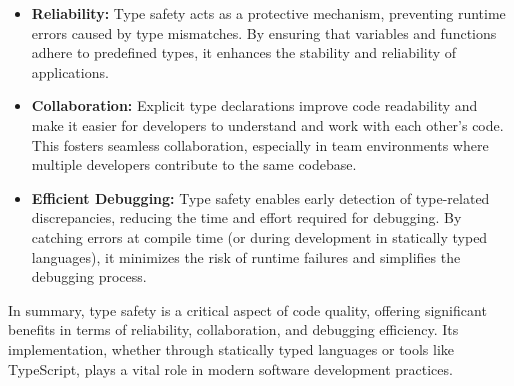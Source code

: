 \begin{itemize}
    \item \textbf{Reliability:} Type safety acts as a protective mechanism, preventing runtime errors caused by type mismatches. By ensuring that variables and functions adhere to predefined types, it enhances the stability and reliability of applications. \cite{dev:type-safety}

    \item \textbf{Collaboration:} Explicit type declarations improve code readability and make it easier for developers to understand and work with each other's code. This fosters seamless collaboration, especially in team environments where multiple developers contribute to the same codebase. \cite{dev:type-safety}

    \item \textbf{Efficient Debugging:} Type safety enables early detection of type-related discrepancies, reducing the time and effort required for debugging. By catching errors at compile time (or during development in statically typed languages), it minimizes the risk of runtime failures and simplifies the debugging process. \cite{dev:type-safety}
\end{itemize}

In summary, type safety is a critical aspect of code quality, offering significant benefits in terms of reliability, collaboration, and debugging efficiency. Its implementation, whether through statically typed languages or tools like TypeScript, plays a vital role in modern software development practices. \cite{dev:type-safety}


